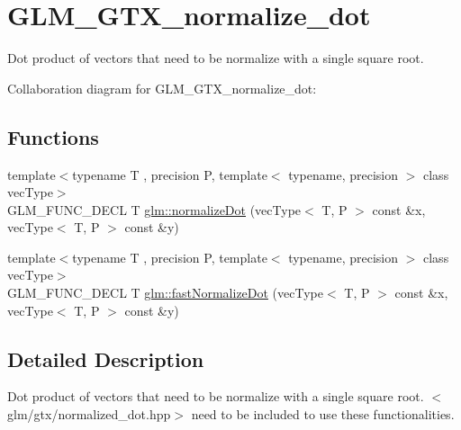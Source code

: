\hypertarget{group__gtx__normalize__dot}{\section{G\-L\-M\-\_\-\-G\-T\-X\-\_\-normalize\-\_\-dot}
\label{group__gtx__normalize__dot}
}


Dot product of vectors that need to be normalize with a single square root.  


Collaboration diagram for G\-L\-M\-\_\-\-G\-T\-X\-\_\-normalize\-\_\-dot\-:
\subsection*{Functions}
\begin{DoxyCompactItemize}
\item 
{\footnotesize template$<$typename T , precision P, template$<$ typename, precision $>$ class vec\-Type$>$ }\\G\-L\-M\-\_\-\-F\-U\-N\-C\-\_\-\-D\-E\-C\-L T \hyperlink{group__gtx__normalize__dot_gaffbc2f2cb15838de8886a68048f9004d}{glm\-::normalize\-Dot} (vec\-Type$<$ T, P $>$ const \&x, vec\-Type$<$ T, P $>$ const \&y)
\item 
{\footnotesize template$<$typename T , precision P, template$<$ typename, precision $>$ class vec\-Type$>$ }\\G\-L\-M\-\_\-\-F\-U\-N\-C\-\_\-\-D\-E\-C\-L T \hyperlink{group__gtx__normalize__dot_ga8593b21bc2fe22184f01d5e08b5a2024}{glm\-::fast\-Normalize\-Dot} (vec\-Type$<$ T, P $>$ const \&x, vec\-Type$<$ T, P $>$ const \&y)
\end{DoxyCompactItemize}


\subsection{Detailed Description}
Dot product of vectors that need to be normalize with a single square root. $<$glm/gtx/normalized\-\_\-dot.\-hpp$>$ need to be included to use these functionalities. 

